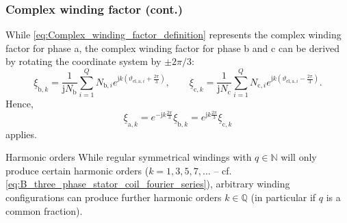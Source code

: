 \begin{frame}
	\frametitle{Complex winding factor (cont.)}
    While \eqref{eq:Complex_winding_factor_definition} represents the complex winding factor for phase a, the complex winding factor for phase b and c can be derived by rotating the coordinate system by $\pm 2\pi/3$:
    \begin{equation}
        \underline{\xi}_{\mathrm{b},k} = \frac{1}{\mathrm{j}N_\mathrm{b}}\sum_{i=1}^{Q} N_{\mathrm{b},i}e^{\mathrm{j}k\left(\vartheta_{\mathrm{el},\mathrm{a},i}+\frac{2\pi}{3}\right)}, \qquad  \underline{\xi}_{\mathrm{c},k} = \frac{1}{\mathrm{j}N_\mathrm{c}}\sum_{i=1}^{Q} N_{\mathrm{c},i}e^{\mathrm{j}k\left(\vartheta_{\mathrm{el},\mathrm{a},i}-\frac{2\pi}{3}\right)}.
        \label{eq:Complex_winding_factor_definition_phase_bc}    
    \end{equation}
    \pause
    Hence,
    \begin{equation}
        \underline{\xi}_{\mathrm{a},k} = e^{-\mathrm{j}k\frac{2\pi}{3}}\underline{\xi}_{\mathrm{b},k} = e^{\mathrm{j}k\frac{2\pi}{3}}\underline{\xi}_{\mathrm{c},k}
        \label{eq:Complex_winding_factor_relation}
    \end{equation}
    applies. 
    \pause
    \begin{varblock}{Harmonic orders}
        While regular symmetrical windings with $q\in\mathbb{N}$ will only produce certain harmonic orders ($k=1,3,5,7,\ldots$ -- cf. \eqref{eq:B_three_phase_stator_coil_fourier_series}), arbitrary winding configurations can produce further harmonic orders $k\in\mathbb{Q}$ (in particular if $q$ is a common fraction).
    \end{varblock}
\end{frame}

